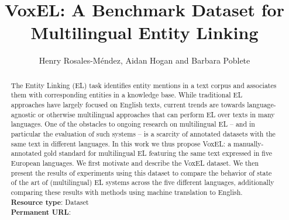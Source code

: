 \documentclass{llncs}
\begin{document}
\title{VoxEL: A Benchmark Dataset for Multilingual Entity Linking}
%
\titlerunning{}  %
%
\author{Henry Rosales-M\'endez, Aidan Hogan and Barbara Poblete}
%
%
%

\maketitle              %
\begin{abstract}

The Entity Linking (EL) task identifies entity mentions in a text corpus and associates them with corresponding entities in a knowledge base. While traditional EL approaches have largely focused on English texts, current trends are towards language-agnostic or otherwise multilingual approaches that can perform EL over texts in many languages. One of the obstacles to ongoing research on multilingual EL -- and in particular the evaluation of such systems -- is a scarcity of annotated datasets with the same text in different languages. In this work we thus propose VoxEL: a manually-annotated gold standard for multilingual EL featuring the same text expressed in five European languages. We first motivate and describe the VoxEL dataset. We then present the results of experiments using this dataset to compare the behavior of state of the art of (multilingual) EL systems across the five different languages, additionally comparing these results with methods using machine translation to English.
\\
\textbf{Resource type}: Dataset\\
\textbf{Permanent URL}:
\end{abstract}
\end{document}
